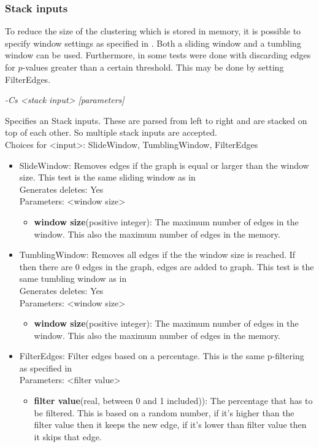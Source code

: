 \documentclass[a4paper]{article}
\begin{document}
\subsubsection{Stack inputs}
To reduce the size of the clustering which is stored in memory, it is possible to specify window settings as specified in \cite{paper}. Both a sliding window and a tumbling window can be used. Furthermore, in \cite{paper} some tests were done with discarding edges for $p$-values greater than a certain threshold. This may be done by setting FilterEdges.


\emph{-Cs <stack input> [parameters]}

Specifies an Stack inputs. These are parsed from left to right and are stacked on top of each other. So multiple stack inputs are accepted. \\
Choices for <input>: SlideWindow, TumblingWindow, FilterEdges

\begin{itemize}
	\item SlideWindow: Removes edges if the graph is equal or larger than the window size. This test is the same sliding window as in \cite{paper} \\
	Generates deletes: Yes \\
	Parameters: <window size>
	
	\begin{itemize}
		\item \textbf{window size}(positive integer): The maximum number of edges in the window. This also the maximum number of edges in the memory.
	\end{itemize}
	
	\item TumblingWindow: Removes all edges if the the window size is reached. If then there are 0 edges in the graph, edges are added to graph. This test is the same tumbling window as in \cite{paper} \\
	Generates deletes: Yes \\
	Parameters: <window size>
	
	\begin{itemize}
		\item \textbf{window size}(positive integer): The maximum number of edges in the window. This also the maximum number of edges in the memory.
	\end{itemize}
	
	\item FilterEdges: Filter edges based on a percentage. This is the same p-filtering as specified in \cite{paper} \\
	Parameters: <filter value>
		
	\begin{itemize}
		\item \textbf{filter value}(real, between 0 and 1 included)): The percentage that has to be filtered. This is based on a random number, if it's higher than the filter value then it keeps the new edge, if it's lower than filter value then it skips that edge.
	\end{itemize}
\end{itemize}
\end{document}

